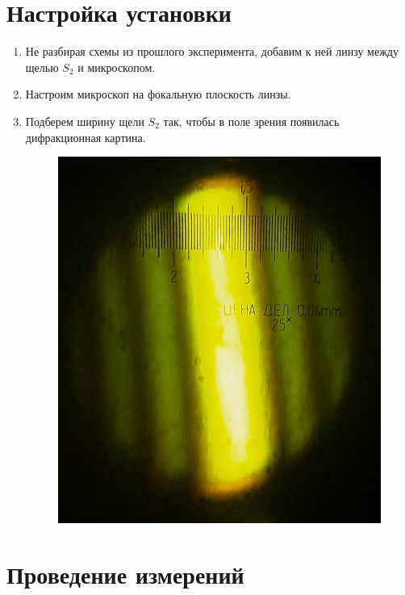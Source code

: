 \documentclass[14pt, a4paper]{report}
\begin{document}
\section{Настройка установки}

\begin{enumerate}

\item Не разбирая схемы из прошлого эксперимента, добавим к ней линзу между щелью $S_2$ и микроскопом.

\item Настроим микроскоп на фокальную плоскость линзы.

\item Подберем ширину щели $S_2$ так, чтобы в поле зрения появилась дифракционная картина.

\begin{figure}[H]
\centering
\includegraphics[scale=0.2]{../images/431m_5}
\end{figure}

\end{enumerate}

\section{Проведение измерений}
\end{document}
